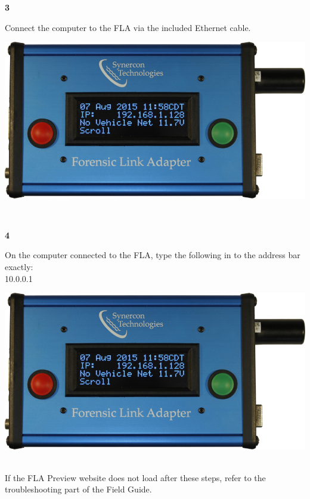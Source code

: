 \documentclass[11pt]{article}
\begin{document}
\noindent\begin{minipage}{0.3\textwidth}%
\begin{center}
\textbf{3}\\[\baselineskip]
\end{center}
Connect the computer to the FLA via the included Ethernet cable.
\end{minipage}%
\hfill%
\begin{minipage}{0.6\textwidth}
\includegraphics[width=\linewidth]{../media/fla_screens/ethernet_and_others/main/title_no_net}
\end{minipage}\\[\baselineskip]
\noindent\begin{minipage}{0.3\textwidth}%
\begin{center}
\textbf{4}\\[\baselineskip]
\end{center}
On the computer connected to the FLA, type the following in to the address bar exactly:\\
10.0.0.1
\end{minipage}%
\hfill%
\begin{minipage}{0.6\textwidth}
\includegraphics[width=\linewidth]{../media/fla_screens/ethernet_and_others/main/title_no_net}
\end{minipage}\\[\baselineskip]
If the FLA Preview website does not load after these steps, refer to the troubleshooting part of the Field Guide.
\end{document}
